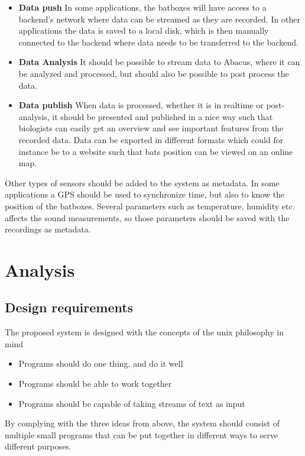 \begin{itemize}
	\item \textbf{Data push} In some applications, the batboxes will have access to a backend’s network where data can be streamed as they are recorded. In other applications the data is saved to a local disk, which is then manually connected to the backend where data needs to be transferred to the backend.
	
	\item \textbf{Data Analysis} It should be possible to stream data to Abacus, where it can be analyzed and processed, but should also be possible to post process the data.

	\item \textbf{Data publish} When data is processed, whether it is in realtime or post-analysis, it should be presented and published in a nice way such that biologists can easily get an overview and see important features from the recorded data. Data can be exported in different formats which could for instance be to a website such that bats position can be viewed on an online map.

\end{itemize}


Other types of sensors should be added to the system as metadata. In some applications a GPS should be used to synchronize time, but also to know the position of the batboxes. Several parameters such as temperature, humidity etc. affects the sound measurements, so those parameters should be saved with the recordings as metadata. 

\newpage
\chapter{Analysis}
\section{Design requirements}
The proposed system is designed with the concepts of the unix philosophy in mind
\begin{itemize}
	\item Programs should do one thing, and do it well
	\item Programs should be able to work together
	\item Programs should be capable of taking streams of text as input
\end{itemize}

By complying with the three ideas from above, the system should consist of multiple small programs that can be put together in different ways to serve different purposes.

